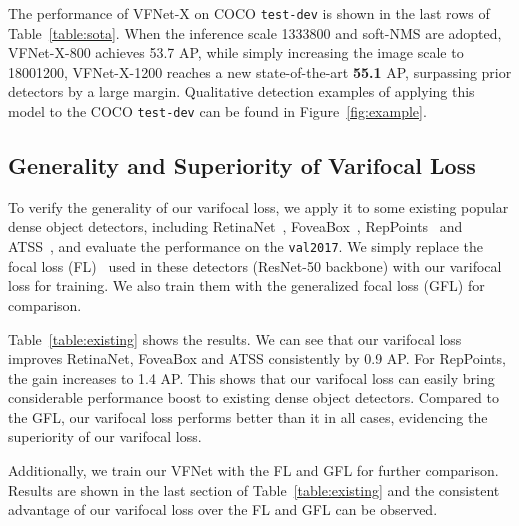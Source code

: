 The performance of VFNet-X on COCO \texttt{test-dev} is shown in the last rows of Table~\ref{table:sota}. When the inference scale 1333800 and soft-NMS\cite{SoftNMS} are adopted, VFNet-X-800 achieves 53.7 AP, while simply increasing the image scale to 18001200, VFNet-X-1200 reaches a new state-of-the-art \textbf{55.1} AP, surpassing prior detectors by a large margin. 
 Qualitative detection examples of applying this model to the COCO \texttt{test-dev} can be found in Figure~\ref{fig:example}.



\vspace{-0.5mm}
\subsection{Generality and Superiority of Varifocal Loss}
\vspace{-0.5mm}
To verify the generality of our varifocal loss, we apply it to some existing popular dense object detectors, including RetinaNet~\cite{retinaNet}, FoveaBox~\cite{foveaBox}, RepPoints~\cite{repPoints} and ATSS~\cite{ATSS}, and evaluate the performance on the \texttt{val2017}. We simply replace the focal loss (FL)~\cite{retinaNet} used in these detectors (ResNet-50 backbone) with our varifocal loss for training. We also train them with the generalized focal loss (GFL) for comparison. 

Table~\ref{table:existing} shows the results.
We can see that our varifocal loss improves RetinaNet, FoveaBox and ATSS consistently by 0.9 AP. For RepPoints, the gain increases to 1.4 AP. This shows that our varifocal loss can easily bring considerable performance boost to existing dense object detectors. Compared to the GFL, our varifocal loss performs better than it in all cases, evidencing the superiority of our varifocal loss. 

Additionally, we train our VFNet with the FL and GFL for further comparison. Results are shown in the last section of Table~\ref{table:existing} and the consistent advantage of our varifocal loss over the FL and GFL can be observed.

\vspace{-2mm}

